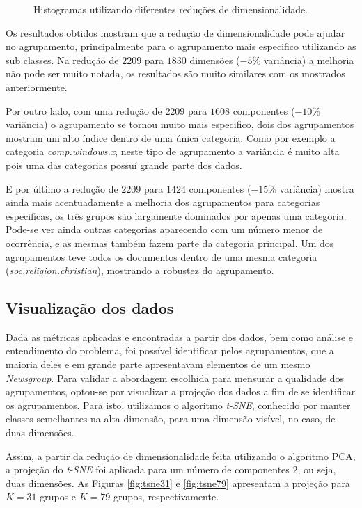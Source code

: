 \documentclass[conference]{IEEEtran}
\begin{document}
\begin{figure}[!h]
{{		}
		\label{fig:pca85}
	}
	\caption{Histogramas utilizando diferentes reduções de dimensionalidade.}
	\label{fig:clusters_pca}
\end{figure}

Os resultados obtidos mostram que a redução de dimensionalidade pode ajudar no agrupamento, principalmente para o agrupamento mais especifico utilizando as sub classes. Na redução de $2209$ para $1830$ dimensões ($-5\%$ variância) a melhoria não pode ser muito notada, os resultados são muito similares com os mostrados anteriormente.

Por outro lado, com uma redução de $2209$ para $1608$ componentes ($-10\%$ variância) o agrupamento se tornou muito mais especifico, dois dos agrupamentos mostram um alto índice dentro de uma única categoria. Como por exemplo a categoria \emph{comp.windows.x}, neste tipo de agrupamento a variância é muito alta pois uma das categorias possuí grande parte dos dados.

E por último a redução de  $2209$ para $1424$ componentes ($-15\%$ variância) mostra ainda mais acentuadamente a melhoria dos agrupamentos para categorias especificas, os três grupos são largamente dominados por apenas uma categoria. Pode-se ver ainda outras categorias aparecendo com um número menor de ocorrência, e as mesmas também fazem parte da categoria principal. Um dos agrupamentos teve todos os documentos dentro de uma mesma categoria (\emph{soc.religion.christian}), mostrando a robustez do agrupamento.

\subsection{Visualização dos dados}

Dada as métricas aplicadas e encontradas a partir dos dados, bem como análise e entendimento do problema, foi possível identificar pelos agrupamentos, que a maioria deles e em grande parte apresentavam elementos de um mesmo \emph{Newsgroup}. Para validar a abordagem escolhida para mensurar a qualidade dos agrupamentos, optou-se por visualizar a projeção dos dados a fim de se identificar os agrupamentos. Para isto, utilizamos o algoritmo \emph{t-SNE}, conhecido por manter classes semelhantes na alta dimensão, para uma dimensão visível, no caso, de duas dimensões.  

Assim, a partir da redução de dimensionalidade feita utilizando o algoritmo PCA, a projeção do \emph{t-SNE} foi aplicada para um número de componentes $2$, ou seja, duas dimensões. As Figuras \ref{fig:tsne31} e \ref{fig:tsne79} apresentam a projeção para $K=31$ grupos e $K=79$ grupos, respectivamente. 
\end{document}
